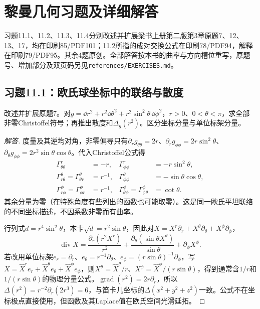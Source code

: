 \section{黎曼几何习题及详细解答}
习题11.1、11.2、11.3、11.4分别改述并扩展梁书上册第二版第3章原题7、12、13、17，均在印刷85/PDF101；11.2所指的成对交换公式在印刷78/PDF94，解释在印刷79/PDF95。其余4题原创。全部解答按本书的曲率与方向槽位重写，原题号、增加部分及双页码另见\texttt{references/EXERCISES.md}。

\subsection*{习题11.1：欧氏球坐标中的联络与散度}
改述并扩展原题7。对$g=\dd r^2+r^2\dd\theta^2+r^2\sin^2\theta\,\dd\phi^2$，$r>0$、$0<\theta<\pi$，求全部非零Christoffel符号；再推出散度和$\Delta_g(r^2)$。区分坐标分量与单位标架分量。
\begin{proof}[解答]
度量及其逆均对角，非零偏导只有$\partial_r g_{\theta\theta}=2r$、$\partial_r g_{\phi\phi}=2r\sin^2\theta$、$\partial_\theta g_{\phi\phi}=2r^2\sin\theta\cos\theta$。代入Christoffel公式得
\begin{align*}
 \Gamma^r_{\theta\theta}&=-r,&\Gamma^r_{\phi\phi}&=-r\sin^2\theta,\\
 \Gamma^\theta_{r\theta}=\Gamma^\theta_{\theta r}&=r^{-1},&
 \Gamma^\theta_{\phi\phi}&=-\sin\theta\cos\theta,\\
 \Gamma^\phi_{r\phi}=\Gamma^\phi_{\phi r}&=r^{-1},&
 \Gamma^\phi_{\theta\phi}=\Gamma^\phi_{\phi\theta}&=\cot\theta.
\end{align*}
其余分量为零（在特殊角度有些列出的函数也可能取零）。这是同一欧氏平坦联络的不同坐标描述，不因系数非零而有曲率。

行列式$d=r^4\sin^2\theta$，本卡$\sqrt d=r^2\sin\theta$，因此对$X=X^r\partial_r+X^\theta\partial_\theta+X^\phi\partial_\phi$，
\[
 \operatorname{div}X=\frac{\partial_r(r^2X^r)}{r^2}
 +\frac{\partial_\theta(\sin\theta X^\theta)}{\sin\theta}
 +\partial_\phi X^\phi.
\]
若改用单位标架$e_r=\partial_r$、$e_\theta=r^{-1}\partial_\theta$、$e_\phi=(r\sin\theta)^{-1}\partial_\phi$，写$X=\widehat X^re_r+\widehat X^\theta e_\theta+\widehat X^\phi e_\phi$，则$X^\theta=\widehat X^\theta/r$、$X^\phi=\widehat X^\phi/(r\sin\theta)$，得到通常含$1/r$和$1/(r\sin\theta)$的物理分量公式。$\operatorname{grad}(r^2)=2r\partial_r$，所以$\Delta(r^2)=r^{-2}\partial_r(2r^3)=6$，与笛卡儿坐标的$\Delta(x^2+y^2+z^2)$一致。公式不在坐标极点直接使用，但函数及其Laplace值在欧氏空间光滑延拓。
\end{proof}


